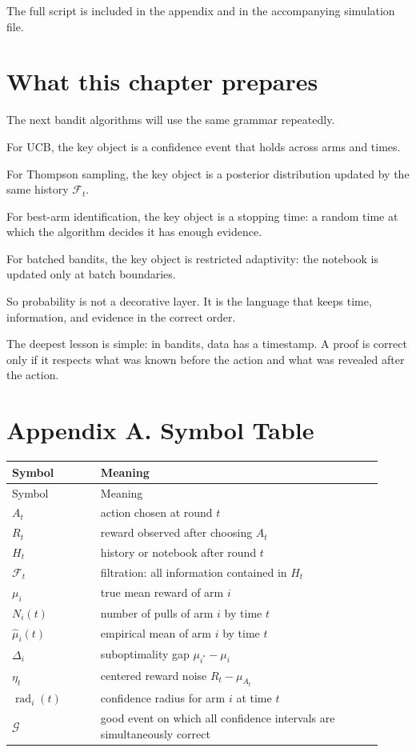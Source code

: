 \documentclass[en,nofont,11pt]{elegantbook}
\newcommand{\F}{\mathcal{F}}
\begin{document}
The full script is included in the appendix and in the accompanying simulation file.

\chapter{What this chapter prepares}

The next bandit algorithms will use the same grammar repeatedly.

For UCB, the key object is a confidence event that holds across arms and times.

For Thompson sampling, the key object is a posterior distribution updated by the same history $\F_t$.

For best-arm identification, the key object is a stopping time: a random time at which the algorithm decides it has enough evidence.

For batched bandits, the key object is restricted adaptivity: the notebook is updated only at batch boundaries.

So probability is not a decorative layer.  It is the language that keeps time, information, and evidence in the correct order.

\begin{keyidea}
The deepest lesson is simple: in bandits, data has a timestamp.  A proof is correct only if it respects what was known before the action and what was revealed after the action.
\end{keyidea}

\chapter*{Appendix A. Symbol Table}

\begin{longtable}{>{\raggedright\arraybackslash}p{0.22\linewidth}p{0.70\linewidth}}
\toprule
Symbol & Meaning \\
\midrule
\endfirsthead
\toprule
Symbol & Meaning \\
\midrule
\endhead
$A_t$ & action chosen at round $t$ \\
$R_t$ & reward observed after choosing $A_t$ \\
$H_t$ & history or notebook after round $t$ \\
$\F_t$ & filtration: all information contained in $H_t$ \\
$\mu_i$ & true mean reward of arm $i$ \\
$N_i(t)$ & number of pulls of arm $i$ by time $t$ \\
$\widehat\mu_i(t)$ & empirical mean of arm $i$ by time $t$ \\
$\Delta_i$ & suboptimality gap $\mu_{i^*}-\mu_i$ \\
$\eta_t$ & centered reward noise $R_t-\mu_{A_t}$ \\
$\operatorname{rad}_i(t)$ & confidence radius for arm $i$ at time $t$ \\
$\mathcal{G}$ & good event on which all confidence intervals are simultaneously correct \\
\bottomrule
\end{longtable}
\end{document}
